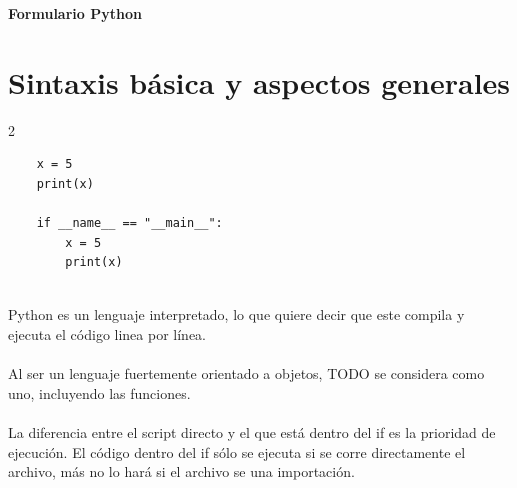 \documentclass[a4paper,10pt]{article}
\begin{document}
\begin{center}
    {\Large \textbf{Formulario Python}}\\
\end{center}



\section*{Sintaxis básica y aspectos generales}
\begin{multicols}{2}
    \begin{lstlisting}
    x = 5
    print(x)

    if __name__ == "__main__":
        x = 5
        print(x)
   
\end{lstlisting}
\columnbreak
Python es un lenguaje interpretado, lo que quiere decir que este compila y ejecuta el código linea por línea.\\\\
Al ser un lenguaje fuertemente orientado a objetos, TODO se considera como uno, incluyendo las funciones.\\\\
La diferencia entre el script directo y el que está dentro del if es la prioridad de ejecución.
El código dentro del if sólo se ejecuta si se corre directamente el archivo, más no lo hará si el archivo se una importación.  
\end{multicols}
\end{document}
